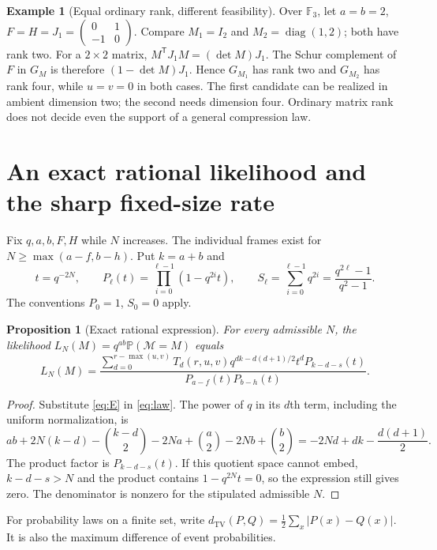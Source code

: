 \documentclass[11pt]{article}
\numberwithin{equation}{section}
\newtheorem{proposition}[theorem]{Proposition}
\theoremstyle{definition}
\newtheorem{example}[theorem]{Example}
\theoremstyle{remark}
\newcommand{\F}{\mathbb F}
\newcommand{\Prob}{\mathbb P}
\newcommand{\TV}{d_{\mathrm{TV}}}
\newcommand{\tr}{\mathsf T}
\newcommand{\abs}[1]{\lvert#1\rvert}
\begin{document}
\begin{example}[Equal ordinary rank, different feasibility]\label{ex:support}
Over $\F_3$, let $a=b=2$, $F=H=J_1=\left(\begin{smallmatrix}0&1\\-1&0\end{smallmatrix}\right)$. Compare $M_1=I_2$ and $M_2=\operatorname{diag}(1,2)$; both have rank two. For a $2\times2$ matrix, $M^\tr J_1M=(\det M)J_1$. The Schur complement of $F$ in $G_M$ is therefore $(1-\det M)J_1$. Hence $G_{M_1}$ has rank two and $G_{M_2}$ has rank four, while $u=v=0$ in both cases. The first candidate can be realized in ambient dimension two; the second needs dimension four. Ordinary matrix rank does not decide even the support of a general compression law.
\end{example}

\section{An exact rational likelihood and the sharp fixed-size rate}
\label{sec:fixed}
Fix $q,a,b,F,H$ while $N$ increases. The individual frames exist for $N\ge\max(a-f,b-h)$. Put $k=a+b$ and
\[
 t=q^{-2N},\qquad P_\ell(t)=\prod_{i=0}^{\ell-1}(1-q^{2i}t),\qquad
 S_\ell=\sum_{i=0}^{\ell-1}q^{2i}=\frac{q^{2\ell}-1}{q^2-1}.
\]
The conventions $P_0=1$, $S_0=0$ apply.

\begin{proposition}[Exact rational expression]\label{prop:rational}
For every admissible $N$, the likelihood $L_N(M)=q^{ab}\Prob(\mathcal M=M)$ equals
\begin{equation}\label{eq:rational}
 L_N(M)=
 \frac{\displaystyle\sum_{d=0}^{r-\max(u,v)}
 T_d(r,u,v)q^{dk-d(d+1)/2}t^dP_{k-d-s}(t)}
 {P_{a-f}(t)P_{b-h}(t)}.
\end{equation}
\end{proposition}
\begin{proof}
Substitute \eqref{eq:E} in \eqref{eq:law}. The power of $q$ in its $d$th term, including the uniform normalization, is
\[
 ab+2N(k-d)-\binom{k-d}{2}-2Na+\binom a2-2Nb+\binom b2
 =-2Nd+dk-\frac{d(d+1)}2.
\]
The product factor is $P_{k-d-s}(t)$. If this quotient space cannot embed, $k-d-s>N$ and the product contains $1-q^{2N}t=0$, so the expression still gives zero. The denominator is nonzero for the stipulated admissible $N$.
\end{proof}

For probability laws on a finite set, write
$\TV(P,Q)=\tfrac12\sum_x\abs{P(x)-Q(x)}$. It is also the maximum difference of event probabilities.
\end{document}
